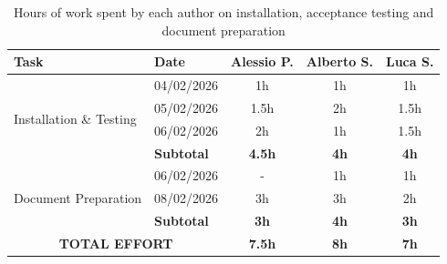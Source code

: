 \begin{table}[H]
\centering
\begin{tabular}{|p{4.5cm}|l|c|c|c|}
\hline
\textbf{Task} & \textbf{Date} & \textbf{Alessio P.} & \textbf{Alberto S.} & \textbf{Luca S.} \\ 
\hline

\multirow{4}{=}{Installation \& Testing} 
& 04/02/2026 & 1h & 1h & 1h \\  
& 05/02/2026 & 1.5h & 2h & 1.5h \\
& 06/02/2026 & 2h & 1h & 1.5h \\
\cline{2-5}
& \textbf{Subtotal} & \textbf{4.5h} & \textbf{4h} & \textbf{4h} \\ 
\hline

\multirow{3}{=}{Document Preparation} 
& 06/02/2026 & - & 1h & 1h \\
& 08/02/2026 & 3h & 3h & 2h \\
\cline{2-5}
& \textbf{Subtotal} & \textbf{3h} & \textbf{4h} & \textbf{3h} \\ 
\hline

\hline
\multicolumn{2}{|c|}{\textbf{TOTAL EFFORT}} & \textbf{7.5h} & \textbf{8h} & \textbf{7h} \\
\hline

\end{tabular}
\caption{Hours of work spent by each author on installation, acceptance testing and document preparation}
\label{tab:effort}
\end{table}